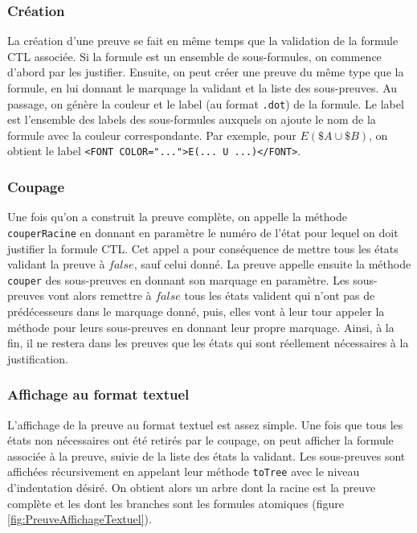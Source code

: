 \documentclass[dvipsnames]{report}
\begin{document}
\subsubsection{Création}

La création d'une preuve se fait en même temps que la validation de la formule CTL associée. Si la formule est un ensemble de sous-formules, on commence d'abord par les justifier. Ensuite, on peut créer une preuve du même type que la formule, en lui donnant le marquage la validant et la liste des sous-preuves. Au passage, on génère la couleur et le label (au format \texttt{.dot}) de la formule. Le label est l'ensemble des labels des sous-formules auxquels on ajoute le nom de la formule avec la couleur correspondante. Par exemple, pour $E(\$A \cup \$B)$, on obtient le label \texttt{<FONT COLOR="...">E(... U ...)</FONT>}.

\subsubsection{Coupage}

Une fois qu'on a construit la preuve complète, on appelle la méthode \texttt{couperRacine} en donnant en paramètre le numéro de l'état pour lequel on doit justifier la formule CTL. Cet appel a pour conséquence de mettre tous les états validant la preuve à $false$, sauf celui donné. La preuve appelle ensuite la méthode \texttt{couper} des sous-preuves en donnant son marquage en paramètre. Les sous-preuves vont alors remettre à $false$ tous les états valident qui n'ont pas de prédécesseurs dans le marquage donné, puis, elles vont à leur tour appeler la méthode pour leurs sous-preuves en donnant leur propre marquage. Ainsi, à la fin, il ne restera dans les preuves que les états qui sont réellement nécessaires à la justification.

\subsubsection{Affichage au format textuel}

L'affichage de la preuve au format textuel est assez simple. Une fois que tous les états non nécessaires ont été retirés par le coupage, on peut afficher la formule associée à la preuve, suivie de la liste des états la validant. Les sous-preuves sont affichées récursivement en appelant leur méthode \texttt{toTree} avec le niveau d'indentation désiré. On obtient alors un arbre dont la racine est la preuve complète et les dont les branches sont les formules atomiques (figure \ref{fig:PreuveAffichageTextuel}).
\end{document}
